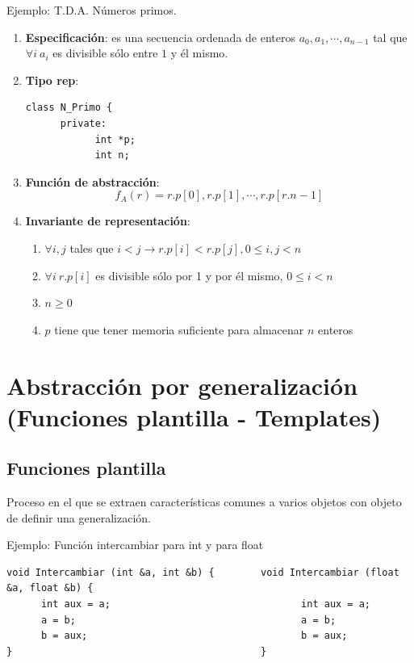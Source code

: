 \documentclass[10pt,a4paper,spanish]{report}
\begin{document}
\noindent
Ejemplo: T.D.A. Números primos.
\begin{enumerate}[$\heartsuit$]
\item \textbf{\textcolor[rgb]{0.8,0.2,0.2}{Especificación}}: es una secuencia ordenada de enteros ${a_{0}, a_{1},\cdots,a_{n-1}}$ tal que $\forall i ~a_{i}$ es divisible sólo entre $1$ y él mismo.
\item \textbf{\textcolor[rgb]{0.8,0.2,0.2}{Tipo rep}}:
\begin{verbatim}
class N_Primo {
      private:
            int *p;
            int n;
\end{verbatim}
\item \textbf{\textcolor[rgb]{0.8,0.2,0.2}{Función de abstracción}}:
\begin{displaymath}
f_{A}(r) = {r.p[0], r.p[1], \cdots, r.p[r.n-1]}
\end{displaymath}

\item \textbf{\textcolor[rgb]{0.8,0.2,0.2}{Invariante de representación}}:
\begin{enumerate}[$\spadesuit$]
\item $\forall i, j$ tales que $i < j \longrightarrow r.p[i] < r.p[j], 0 \leq i, j < n$
\item $\forall i ~r.p[i]$ es divisible sólo por 1 y por él mismo, $0 \leq i < n$
\item $n \geq 0$
\item $p$ tiene que tener memoria suficiente para almacenar $n$ enteros
\end{enumerate}
\end{enumerate}

\section{\textcolor[rgb]{0.8,0.2,0.2}Abstracción por generalización (Funciones plantilla - Templates)}
\subsection{\textcolor[rgb]{0.8,0.2,0.2}Funciones plantilla}
\noindent
Proceso en el que se extraen características comunes a varios objetos con objeto de definir una generalización.

\noindent
Ejemplo: Función intercambiar para int y para float
\begin{verbatim}
void Intercambiar (int &a, int &b) {        void Intercambiar (float &a, float &b) {
      int aux = a;                                 int aux = a;
      a = b;                                       a = b;
      b = aux;                                     b = aux;
}                                           }
\end{verbatim}
\end{document}
